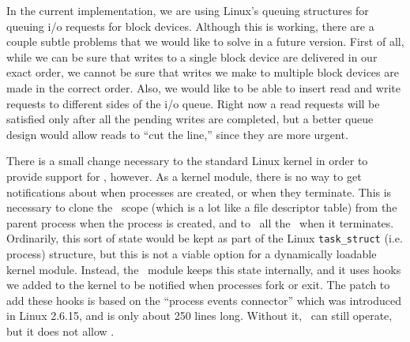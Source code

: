 In the current implementation, we are using Linux's queuing structures
for queuing i/o requests for block devices. Although this is working,
there are a couple subtle problems that we would like to solve in a
future version. First of all, while we can be sure that writes to a
single block device are delivered in our exact order, we cannot be
sure that writes we make to multiple block devices are made in the
correct order. Also, we would like to be able to insert read and write
requests to different sides of the i/o queue. Right now a read
requests will be satisfied only after all the pending writes are
completed, but a better queue design would allow reads to ``cut the
line,'' since they are more urgent.

There is a small change necessary to the standard Linux kernel in order to
provide support for \opgroups, however. As a kernel module, there is no way to
get notifications about when processes are created, or when they terminate. This
is necessary to clone the \opgroup\ scope (which is a lot like a file descriptor
table) from the parent process when the process is created, and to \abandon\ all
the \opgroups\ when it terminates. Ordinarily, this sort of state would be kept
as part of the Linux \texttt{task\_struct} (i.e. process) structure, but this is
not a viable option for a dynamically loadable kernel module. Instead, the
\Kudos\ module keeps this state internally, and it uses hooks we added to the
kernel to be notified when processes fork or exit. The patch to add these hooks
is based on the ``process events connector'' which was introduced in Linux
2.6.15, and is only about 250 lines long. Without it, \Kudos\ can still operate,
but it does not allow \opgroups.
